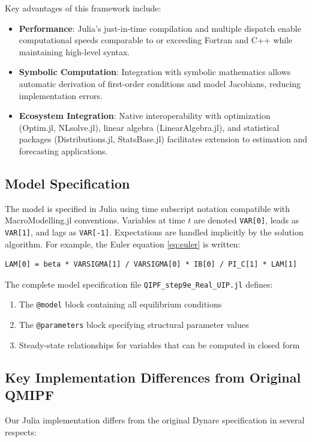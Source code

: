 \documentclass[12pt]{article}
\begin{document}
Key advantages of this framework include:
\begin{itemize}
\item \textbf{Performance}: Julia's just-in-time compilation and multiple dispatch enable computational speeds comparable to or exceeding Fortran and C++ while maintaining high-level syntax.
\item \textbf{Symbolic Computation}: Integration with symbolic mathematics allows automatic derivation of first-order conditions and model Jacobians, reducing implementation errors.
\item \textbf{Ecosystem Integration}: Native interoperability with optimization (Optim.jl, NLsolve.jl), linear algebra (LinearAlgebra.jl), and statistical packages (Distributions.jl, StatsBase.jl) facilitates extension to estimation and forecasting applications.
\end{itemize}

\subsection{Model Specification}

The model is specified in Julia using time subscript notation compatible with MacroModelling.jl conventions. Variables at time $t$ are denoted \texttt{VAR[0]}, leads as \texttt{VAR[1]}, and lags as \texttt{VAR[-1]}. Expectations are handled implicitly by the solution algorithm. For example, the Euler equation \eqref{eq:euler} is written:
\begin{verbatim}
LAM[0] = beta * VARSIGMA[1] / VARSIGMA[0] * IB[0] / PI_C[1] * LAM[1]
\end{verbatim}

The complete model specification file \texttt{QIPF\_step9e\_Real\_UIP.jl} defines:
\begin{enumerate}
\item The \texttt{@model} block containing all equilibrium conditions
\item The \texttt{@parameters} block specifying structural parameter values
\item Steady-state relationships for variables that can be computed in closed form
\end{enumerate}

\subsection{Key Implementation Differences from Original QMIPF}

Our Julia implementation differs from the original Dynare specification in several respects:
\end{document}

